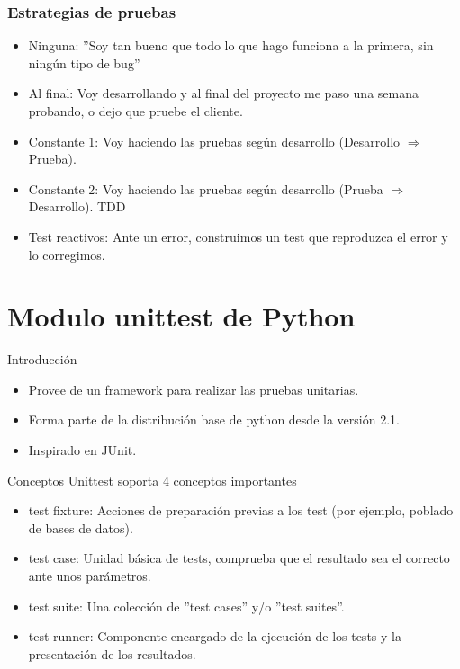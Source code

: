 \documentclass[10pt]{beamer}
\begin{document}
  \begin{frame}
    \frametitle{Estrategias de pruebas}
    \begin{itemize}
      \item Ninguna: ''Soy tan bueno que todo lo que hago funciona a la primera, sin ningún tipo de bug''
      \item Al final: Voy desarrollando y al final del proyecto me paso una semana probando, o dejo que pruebe el cliente.
      \item Constante 1: Voy haciendo las pruebas según desarrollo (Desarrollo $\Rightarrow$ Prueba).
      \item Constante 2: Voy haciendo las pruebas según desarrollo (Prueba $\Rightarrow$ Desarrollo). TDD
      \item Test reactivos: Ante un error, construimos un test que reproduzca el error y lo corregimos.
    \end{itemize}
  \end{frame}
  
  \section*{Modulo unittest de Python}
  \begin{frame}{Introducción}
    \begin{itemize}
      \item Provee de un framework para realizar las pruebas unitarias.
      \item Forma parte de la distribución base de python desde la versión 2.1.
      \item Inspirado en JUnit.
    \end{itemize}
  \end{frame}

  \begin{frame}{Conceptos}
    Unittest soporta 4 conceptos importantes
    \begin{itemize}
      \item test fixture: Acciones de preparación previas a los test (por ejemplo, poblado de bases de datos).
      \item test case: Unidad básica de tests, comprueba que el resultado sea el correcto ante unos parámetros.
      \item test suite: Una colección de ''test cases'' y/o ''test suites''.
      \item test runner: Componente encargado de la ejecución de los tests y la presentación de los resultados.
    \end{itemize}
  \end{frame}
\end{document}
